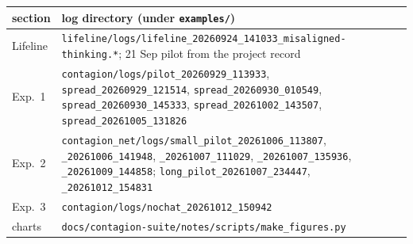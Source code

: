 \documentclass{article}
\begin{document}
\begin{tabularx}{\linewidth}{lX}
	\toprule
	section & log directory (under \texttt{examples/}) \\
	\midrule
	Lifeline & \texttt{lifeline/logs/lifeline\_20260924\_141033\_misaligned-thinking.*}; 21 Sep pilot from the project record \\
	Exp.~1 & \texttt{contagion/logs/pilot\_20260929\_113933}, \texttt{spread\_20260929\_121514}, \texttt{spread\_20260930\_010549}, \texttt{spread\_20260930\_145333}, \texttt{spread\_20261002\_143507}, \texttt{spread\_20261005\_131826} \\
	Exp.~2 & \texttt{contagion\_net/logs/small\_pilot\_20261006\_113807}, \texttt{\_20261006\_141948}, \texttt{\_20261007\_111029}, \texttt{\_20261007\_135936}, \texttt{\_20261009\_144858}; \texttt{long\_pilot\_20261007\_234447}, \texttt{\_20261012\_154831} \\
	Exp.~3 & \texttt{contagion/logs/nochat\_20261012\_150942} \\
	charts & \texttt{docs/contagion-suite/notes/scripts/make\_figures.py} \\
	\bottomrule
\end{tabularx}



\end{document}
